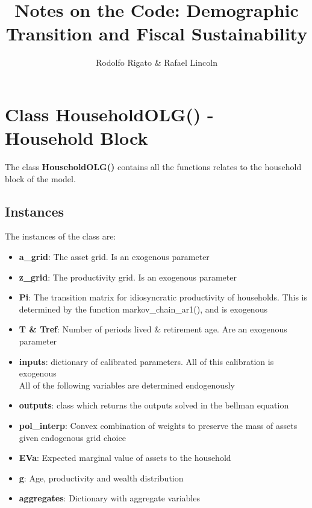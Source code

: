 \documentclass[12pt]{article} %
\theoremstyle{theorem}
\theoremstyle{definition}
\begin{document}
\title{Notes on the Code: Demographic Transition and Fiscal Sustainability}

\author{Rodolfo Rigato \& Rafael Lincoln}

\maketitle

\section*{Class HouseholdOLG() - Household Block}

The class \textbf{HouseholdOLG()} contains all the functions relates to the household block of the model. 

\subsection*{Instances}
The instances of the class are:

\begin{itemize}
\item \textbf{a\_grid}: The asset grid. Is an exogenous parameter
\item \textbf{z\_grid}: The productivity grid. Is an exogenous parameter
\item \textbf{Pi}: The transition matrix for idiosyncratic productivity of households. This is determined by the function markov\_chain\_ar1(), and is exogenous
\item \textbf{T \& Tref}: Number of periods lived \& retirement age. Are an exogenous parameter
\item \textbf{inputs}: dictionary of calibrated parameters. All of this calibration is exogenous \\


All of the following variables are determined endogenously
\item \textbf{outputs}: class which returns the outputs solved in the bellman equation
\item \textbf{pol\_interp}: Convex combination of weights to preserve the mass of assets given endogenous grid choice
\item \textbf{EVa}: Expected marginal value of assets to the household
\item \textbf{g}: Age, productivity and wealth distribution
\item \textbf{aggregates}: Dictionary with aggregate variables
\end{itemize}
\end{document}
